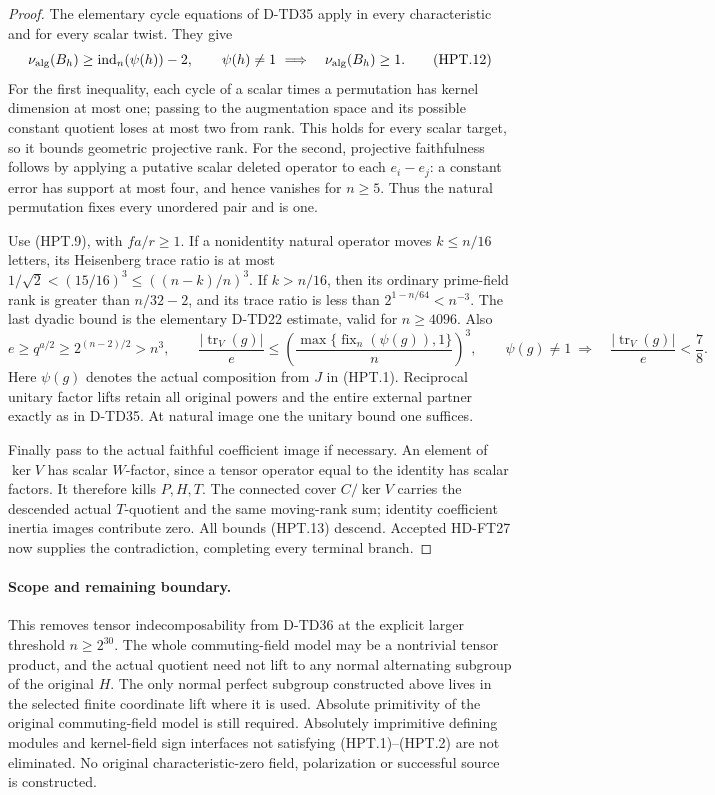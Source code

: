 \begin{proof}
The elementary cycle equations of D-TD35 apply in every
characteristic and for every scalar twist.  They give
\[
 \nu_{\rm alg}(B_h)\ge\operatorname{ind}_n(\psi(h))-2,
 \qquad \psi(h)\ne1\ \Longrightarrow\quad
                       \nu_{\rm alg}(B_h)\ge1.
 \tag{HPT.12}
\]
For the first inequality, each cycle of a scalar times a
permutation has kernel dimension at most one; passing to the
augmentation space and its possible constant quotient loses
at most two from rank.  This holds for every scalar target,
so it bounds geometric projective rank.  For the second,
projective faithfulness follows by applying a putative scalar
deleted operator to each $e_i-e_j$: a constant error has
support at most four, and hence vanishes for $n\ge5$.
Thus the natural permutation fixes every unordered pair and is one.

Use (HPT.9), with $f a/r\ge1$.  If a nonidentity natural
operator moves $k\le n/16$ letters, its Heisenberg trace ratio
is at most $1/\sqrt2<(15/16)^3\le((n-k)/n)^3$.
If $k>n/16$, then its ordinary prime-field rank is greater
than $n/32-2$, and its trace ratio is less than
$2^{1-n/64}<n^{-3}$.  The last dyadic bound is the elementary
D-TD22 estimate, valid for $n\ge4096$.  Also
\[
 e\ge q^{a/2}\ge2^{(n-2)/2}>n^3,
 \qquad
 \frac{|\operatorname{tr}_V(g)|}{e}
       \le\left(\frac{\max\{\operatorname{fix}_n(\psi(g)),1\}}n\right)^3,
 \qquad
 \psi(g)\ne1\ \Longrightarrow\quad
       \frac{|\operatorname{tr}_V(g)|}{e}<\frac78.
 \tag{HPT.13}
\]
Here $\psi(g)$ denotes the actual composition from $J$ in
(HPT.1).  Reciprocal unitary factor lifts retain all original
powers and the entire external partner exactly as in D-TD35.
At natural image one the unitary bound one suffices.

Finally pass to the actual faithful coefficient image if necessary.
An element of $\ker V$ has scalar $W$-factor, since a tensor
operator equal to the identity has scalar factors.  It therefore
kills $P,H,T$.  The connected cover $C/\ker V$ carries the
descended actual $T$-quotient and the same moving-rank sum;
identity coefficient inertia images contribute zero.
All bounds (HPT.13) descend.  Accepted HD-FT27 now supplies
the contradiction, completing every terminal branch.
\end{proof}

\paragraph{Scope and remaining boundary.}
This removes tensor indecomposability from D-TD36 at the explicit
larger threshold $n\ge2^{30}$.  The whole commuting-field model
may be a nontrivial tensor product, and the actual quotient need
not lift to any normal alternating subgroup of the original $H$.
The only normal perfect subgroup constructed above lives in the
selected finite coordinate lift where it is used.
Absolute primitivity of the original commuting-field model is
still required.  Absolutely imprimitive defining modules and
kernel-field sign interfaces not satisfying (HPT.1)--(HPT.2)
are not eliminated.  No original characteristic-zero field,
polarization or successful source is constructed.
